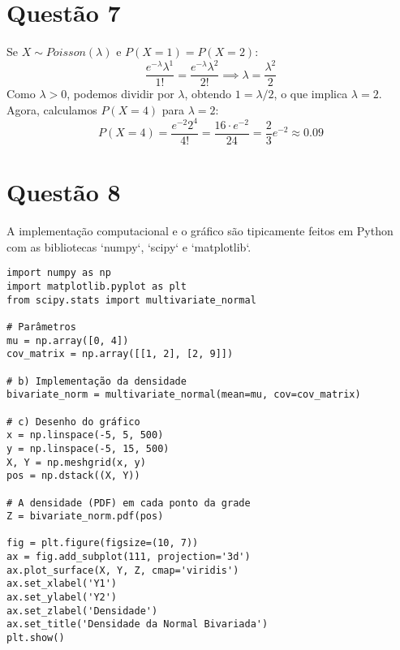 \documentclass[12pt, a4paper]{article}
\begin{document}
\section*{Questão 7}
Se $X \sim Poisson(\lambda)$ e $P(X=1) = P(X=2)$:
$$ \frac{e^{-\lambda}\lambda^1}{1!} = \frac{e^{-\lambda}\lambda^2}{2!} \implies \lambda = \frac{\lambda^2}{2} $$
Como $\lambda>0$, podemos dividir por $\lambda$, obtendo $1 = \lambda/2$, o que implica $\lambda=2$.
Agora, calculamos $P(X=4)$ para $\lambda=2$:
$$ P(X=4) = \frac{e^{-2}2^4}{4!} = \frac{16 \cdot e^{-2}}{24} = \frac{2}{3}e^{-2} \approx 0.09 $$

\section*{Questão 8}
A implementação computacional e o gráfico são tipicamente feitos em Python com as bibliotecas `numpy`, `scipy` e `matplotlib`.
\begin{verbatim}
import numpy as np
import matplotlib.pyplot as plt
from scipy.stats import multivariate_normal

# Parâmetros
mu = np.array([0, 4])
cov_matrix = np.array([[1, 2], [2, 9]])

# b) Implementação da densidade
bivariate_norm = multivariate_normal(mean=mu, cov=cov_matrix)

# c) Desenho do gráfico
x = np.linspace(-5, 5, 500)
y = np.linspace(-5, 15, 500)
X, Y = np.meshgrid(x, y)
pos = np.dstack((X, Y))

# A densidade (PDF) em cada ponto da grade
Z = bivariate_norm.pdf(pos)

fig = plt.figure(figsize=(10, 7))
ax = fig.add_subplot(111, projection='3d')
ax.plot_surface(X, Y, Z, cmap='viridis')
ax.set_xlabel('Y1')
ax.set_ylabel('Y2')
ax.set_zlabel('Densidade')
ax.set_title('Densidade da Normal Bivariada')
plt.show()
\end{verbatim}
\end{document}
